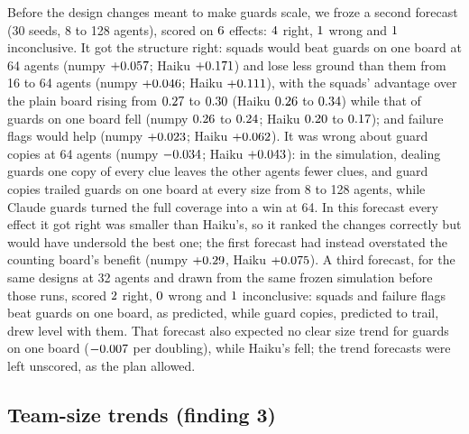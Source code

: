 \documentclass{article}
\begin{document}
Before the design changes meant to make guards scale, we froze a second forecast (30 seeds, 8 to 128 agents), scored on $6$ effects: $4$ right, $1$ wrong and $1$ inconclusive. It got the structure right: squads would beat guards on one board at 64 agents (numpy $+0.057$; Haiku $+0.171$) and lose less ground than them from 16 to 64 agents (numpy $+0.046$; Haiku $+0.111$), with the squads' advantage over the plain board rising from $0.27$ to $0.30$ (Haiku $0.26$ to $0.34$) while that of guards on one board fell (numpy $0.26$ to $0.24$; Haiku $0.20$ to $0.17$); and failure flags would help (numpy $+0.023$; Haiku $+0.062$). It was wrong about guard copies at 64 agents (numpy $-0.034$; Haiku $+0.043$): in the simulation, dealing guards one copy of every clue leaves the other agents fewer clues, and guard copies trailed guards on one board at every size from 8 to 128 agents, while Claude guards turned the full coverage into a win at 64. In this forecast every effect it got right was smaller than Haiku's, so it ranked the changes correctly but would have undersold the best one; the first forecast had instead overstated the counting board's benefit (numpy $+0.29$, Haiku $+0.075$). A third forecast, for the same designs at 32 agents and drawn from the same frozen simulation before those runs, scored $2$ right, $0$ wrong and $1$ inconclusive: squads and failure flags beat guards on one board, as predicted, while guard copies, predicted to trail, drew level with them. That forecast also expected no clear size trend for guards on one board ($-0.007$ per doubling), while Haiku's fell; the trend forecasts were left unscored, as the plan allowed.

\subsection{Team-size trends (finding 3)}
\end{document}
